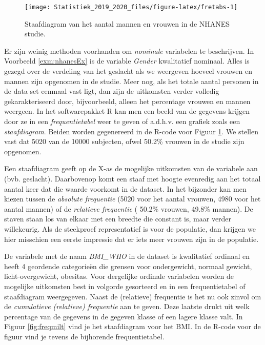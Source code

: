 \documentclass[12pt,dutch,coursenotes]{book}
\theoremstyle{definition}
\theoremstyle{definition}
\theoremstyle{definition}
\theoremstyle{remark}
\begin{document}
\begin{figure}

{\centering \texttt{[image: Statistiek\_2019\_2020\_files/figure-latex/fretabs-1]} 

}

\caption{Staafdiagram van het aantal mannen en vrouwen in de NHANES studie.}\label{fig:fretabs}
\end{figure}

Er zijn weinig methoden voorhanden om \emph{nominale} variabelen te
beschrijven. In Voorbeeld \ref{exm:nhanesEx} is de variable
\emph{Gender} kwalitatief nominaal. Alles is gezegd over de verdeling
van het geslacht als we weergeven hoeveel vrouwen en mannen zijn
opgenomen in de studie. Meer nog, als het totale aantal personen in de
data set eenmaal vast ligt, dan zijn de uitkomsten verder volledig
gekarakteriseerd door, bijvoorbeeld, alleen het percentage vrouwen en
mannen weergeen. In het softwarepakket R kan men een beeld van de
gegevens krijgen door ze in een \emph{frequentietabel} weer te geven of
a.d.h.v. een grafiek zoals een \emph{staafdiagram}. Beiden worden
gegenereerd in de R-code voor Figuur \ref{fig:fretabs}. We stellen vast
dat 5020 van de 10000 subjecten, ofwel 50.2\% vrouwen in de studie zijn
opgenomen.

Een staafdiagram geeft op de X-as de mogelijke uitkomsten van de
variabele aan (bvb. geslacht). Daarbovenop komt een staaf met hoogte
evenredig aan het totaal aantal keer dat die waarde voorkomt in de
dataset. In het bijzonder kan men kiezen tussen de \emph{absolute
frequentie} (5020 voor het aantal vrouwen, 4980 voor het aantal mannen)
of de \emph{relatieve frequentie} ( 50.2\% vrouwen, 49.8\% mannen). De
staven staan los van elkaar met een breedte die constant is, maar verder
willekeurig. Als de steekproef representatief is voor de populatie, dan
krijgen we hier misschien een eerste impressie dat er iets meer vrouwen
zijn in de populatie.

De variabele met de naam \emph{BMI\_WHO} in de dataset is kwalitatief
ordinaal en heeft 4 geordende categorieën die grensen voor ondergewicht,
normaal gewicht, licht-overgewicht, obesitas. Voor dergelijke ordinale
variabelen worden de mogelijke uitkomsten best in volgorde gesorteerd en
in een frequentietabel of staafdiagram weergegeven. Naast de (relatieve)
frequentie is het nu ook zinvol om de \emph{cumulatieve (relatieve)
frequentie} aan te geven. Deze laatste drukt uit welk percentage van de
gegevens in de gegeven klasse of een lagere klasse valt. In Figuur
\ref{fig:freqmilt} vind je het staafdiagram voor het BMI. In de R-code
voor de figuur vind je tevens de bijhorende frequentietabel.
\end{document}

